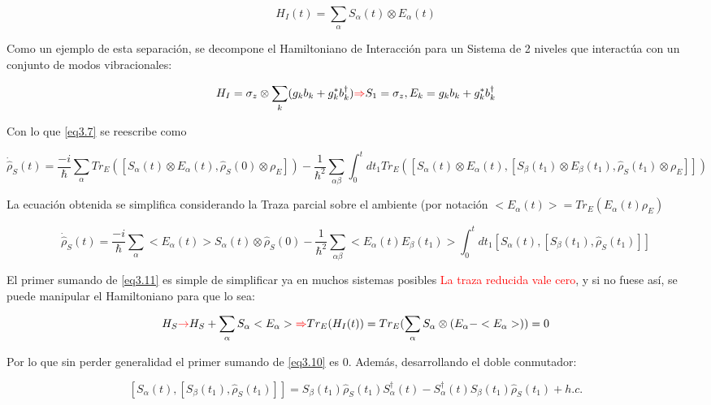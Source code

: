 \documentclass{book}
\begin{document}
\begin{equation}\label{eq3.8}H_I(t)=\sum_\alpha S_\alpha(t)\otimes E_\alpha(t)\end{equation}

Como un ejemplo de esta separación, se decompone el Hamiltoniano de Interacción para un Sistema de 2 niveles que interactúa con un conjunto de modos vibracionales:

\begin{equation}\label{eq3.9}H_I=\sigma_z\otimes\sum_k(g_kb_k+g_k^*b_k^\dag) \textcolor{red}{\Rightarrow}S_1=\sigma_z, E_k=g_kb_k+g_k^*b_k^\dag\end{equation}

Con lo que \ref{eq3.7} se reescribe como

\begin{equation}\label{eq3.10}\dot{\hat{\rho}}_S(t)=\frac{-i}{\hslash}\sum
_\alpha Tr_E([S_\alpha(t)\otimes E_\alpha(t),\hat{\rho}_S(0)\otimes\rho_E])-\frac{1}{\hslash^2}\sum_{\alpha\beta}\int_0^t dt_1 Tr_E([S_\alpha(t)\otimes E_\alpha(t),[S_\beta(t_1)\otimes E_\beta(t_1),\hat{\rho}_S(t_1)\otimes\rho_E]])\end{equation}

La ecuación obtenida se simplifica considerando la Traza parcial sobre el ambiente (por notación $<E_\alpha(t)>=Tr_E(E_\alpha(t)\rho_E)$

\begin{equation}\label{eq3.11}
\dot{\hat{\rho}}_S(t)=\frac{-i}{\hslash}\sum
_\alpha <E_\alpha(t)> S_\alpha(t)\otimes \hat{\rho}_S(0) -\frac{1}{\hslash^2}\sum_{\alpha\beta} <E_\alpha(t)E_\beta(t_1)>\int_0^t dt_1 [S_\alpha(t),[S_\beta(t_1),\hat{\rho}_S(t_1)]]
\end{equation}

El primer sumando de \ref{eq3.11} es simple de simplificar ya en muchos sistemas posibles \textcolor{red}{La traza reducida vale cero}, y si no fuese así, se puede manipular el Hamiltoniano para que lo sea:

\begin{equation}\label{eq3.12}H_S \textcolor{red}{\rightarrow} H_S+\sum_\alpha S_\alpha <E_\alpha> \textcolor{red}{\Rightarrow} Tr_E(H_I(t))=Tr_E(\sum_\alpha S_\alpha\otimes(E_\alpha-<E_\alpha>))=0 \end{equation}

Por lo que sin perder generalidad el primer sumando de \ref{eq3.10} es 0. Además, desarrollando el doble conmutador:

\begin{equation}\label{eq3.13}[S_\alpha(t),[S_\beta(t_1),\hat{\rho}_S(t_1)]]=S_\beta(t_1)\hat{\rho}_S(t_1)S_\alpha^\dag(t)-S^\dag_\alpha(t)S_\beta(t_1)\hat{\rho}_S(t_1)+h.c.\end{equation}
\end{document}
